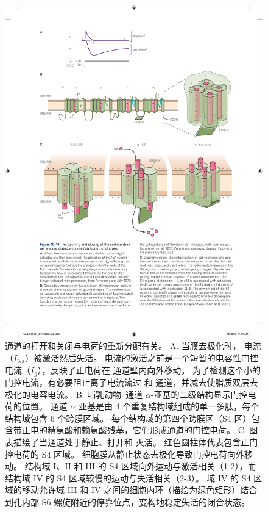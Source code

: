 \begin{figure}[htbp]
	\centering
	\includegraphics[width=1.0\linewidth]{chap10/fig_10_10}
	\caption{通道的打开和关闭与电荷的重新分配有关。
		A. 当膜去极化时， 电流（$I_\text{Na}$）被激活然后失活。
		 电流的激活之前是一个短暂的电容性门控电流（$I_g$），反映了正电荷在  通道壁内向外移动。
		为了检测这个小的门控电流，有必要阻止离子电流流过  和  通道，并减去使脂质双层去极化的电容电流\cite{armstrong1979fast}。
		B. 哺乳动物~通道 $\alpha$-亚基的二级结构显示门控电荷的位置。
		通道 $\alpha$ 亚基是由 4 个重复结构域组成的单一多肽，每个结构域包含 6 个跨膜区域。
		每个结构域的第四个跨膜区（S4 区）包含带正电的精氨酸和赖氨酸残基，它们形成通道的门控电荷\cite{ahern2016hitchhiker}。
		C. 图表描绘了当通道处于静止、打开和 灭活。
		红色圆柱体代表包含正门控电荷的 S4 区域。
		细胞膜从静止状态去极化导致门控电荷向外移动。
		结构域 I、II 和 III 的 S4 区域向外运动与激活相关（1-2），而结构域 IV 的 S4 区域较慢的运动与失活相关（2-3）。
		域 IV 的 S4 区域的移动允许域 III 和 IV 之间的细胞内环（描绘为绿色矩形）结合到孔内部 S6 螺旋附近的停靠位点，变构地稳定失活的闭合状态\cite{ahern2016hitchhiker}。}
	\label{fig:10_10}
\end{figure}



